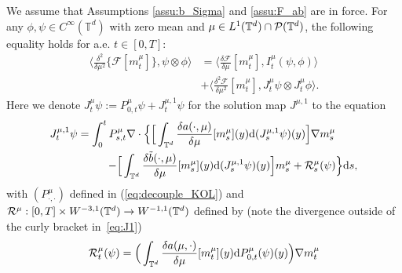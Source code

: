 
 \begin{lem}\label{lem:duality}
We assume that Assumptions \ref{assu:b_Sigma} and \ref{assu:F_ab} are in force. For any $\phi, \psi \in C^{\infty}(\mathbb{T}^d)$ with zero mean and $\mu \in L^1(\mathbb{T}^d) \cap \mathcal{P}(\mathbb{T}^d)$, the following equality holds for a.e. $t \in [0,T]$:
\begin{equation}\label{eq:dual_repre_D2_mu_F}
\begin{split}
    \Big\langle \frac{\delta^2}{\delta \mu^2}\Big\{\mathcal{F}[m_t^{\mu}]\Big\}, \psi\otimes \phi \Big\rangle  & =  \Big\langle \frac{\delta \mathcal{F}}{\delta \mu} [m_t^{\mu}],  I^{\mu}_{t}(\psi, \phi) \Big\rangle\\
   &+\Big\langle \frac{\delta^2\mathcal{F}}{\delta \mu^2} [m_t^{\mu}], J_t^{\mu}\psi\otimes  J_t^{\mu}\phi\Big\rangle.
\end{split}
\end{equation}
Here we denote $J_t^{\mu}\psi := P^{\mu}_{0,t}\psi + J^{\mu,1}_t\psi$ for the solution map $J^{\mu,1}$ to the equation
\begin{equation}\label{eq:J1}
\begin{split}
J_t^{\mu,1} \psi = \int_0^t P^{\mu}_{s,t}\nabla \cdot \Big\{ \Big[\int_{\mathbb{T}^d}\frac{\delta a(\cdot, \mu)}{\delta \mu}[m^{\mu}_s](y) \mathrm{d}(J_s^{\mu,1} \psi)(y)\Big] \nabla m_s^{\mu}\qquad \\
 - \Big[\int_{\mathbb{T}^d}\frac{\delta \tilde{b}(\cdot, \mu)}{\delta \mu}[m^{\mu}_s](y) \mathrm{d}(J_s^{\mu,1} \psi)(y)\Big] m_s^{\mu} + \mathcal{R}^{\mu}_s(\psi)\Big\}\mathrm{d}s,
\end{split}
\end{equation}
with $(P^{\mu}_{\cdot,\cdot})$ defined in (\ref{eq:decouple_KOL}) and $\mathcal{R}^{\mu}: [0,T] \times W^{-3,1}(\mathbb{T}^d)  \to W^{-1,1}(\mathbb{T}^d)$ defined by (note the divergence outside of the curly bracket in~\eqref{eq:J1})
\begin{equation}\label{eq:def-R-mu-phi}
\begin{split}
    \mcl{R}^{\mu}_t(\psi) =  \Big(\int_{\mathbb{T}^d}\frac{\delta a(\mu, \cdot)}{\delta\mu}[m_t^{\mu}](y)\mathrm{d}P^{\mu}_{0,t} (\psi)(y) \Big)\nabla m^{\mu}_t \\

\end{split}
\end{equation}
\end{lem}
